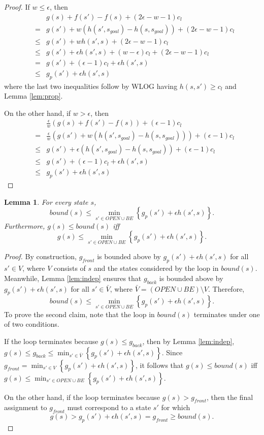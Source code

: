 \documentclass[letterpaper]{article}
\newtheorem{lemma}{Lemma}
\begin{document}
\begin{proof}
If $w \le \epsilon$, then
\begin{eqnarray*}
&&g(s) + f(s') - f(s) + (2\epsilon-w-1)c_l
\\&=& g(s') + w(h(s',s_{goal}) - h(s,s_{goal})) + (2\epsilon-w-1)c_l
\\&\le& g(s') + wh(s',s) + (2\epsilon-w-1)c_l
\\&\le& g(s') + \epsilon h(s',s) + (w-\epsilon)c_l + (2\epsilon-w-1)c_l
\\&=& g(s') + (\epsilon-1)c_l + \epsilon h(s',s)
\\&\le& g_p(s') + \epsilon h(s',s)
\end{eqnarray*}
where the last two inequalities follow by WLOG having $h(s,s') \ge c_l$ and Lemma \ref{lem:prop}.

On the other hand, if $w > \epsilon$, then
\begin{eqnarray*}
&&\frac\epsilon w\left(g(s) + f(s') - f(s)\right) + (\epsilon-1)c_l
\\&=& \frac\epsilon w\left(g(s') + w(h(s',s_{goal}) - h(s,s_{goal})) \right) + (\epsilon-1)c_l
\\&\le& g(s') + \epsilon(h(s',s_{goal}) - h(s,s_{goal})) + (\epsilon-1)c_l
\\&\le& g(s') + (\epsilon-1)c_l + \epsilon h(s',s)
\\&\le& g_p(s') + \epsilon h(s',s)
\end{eqnarray*}
\end{proof}

\begin{lemma}
\label{lem:bound}
For every state $s$,
\[bound(s) \le \min_{s'\in OPEN \cup BE} \left\{ g_p(s') + \epsilon h(s',s) \right\}.\]
Furthermore, $g(s) \le bound(s)$ iff
\[g(s) \le \min_{s'\in OPEN \cup BE} \left\{ g_p(s') + \epsilon h(s',s) \right\}.\]
\end{lemma}

\begin{proof}
By construction, $g_{front}$ is bounded above by $g_p(s') + \epsilon h(s',s)$ for all $s'\in V$, where $V$ consists of $s$ and the states considered by the loop in $bound(s)$. Meanwhile, Lemma \ref{lem:indep} ensures that $g_{back}$ is bounded above by $g_p(s') + \epsilon h(s',s)$ for all $s'\in \bar V$, where $\bar V = (OPEN \cup BE) \setminus V$. Therefore,
\[bound(s) \le \min_{s' \in OPEN \cup BE} \left\{g_p(s') + \epsilon h(s',s)\right\}.\]
To prove the second claim, note that the loop in $bound(s)$ terminates under one of two conditions.

If the loop terminates because $g(s) \le g_{back}$, then by Lemma \ref{lem:indep}, $g(s) \le g_{back} \le \min_{s'\in \bar V} \left\{ g_p(s') + \epsilon h(s',s) \right\}$. Since $g_{front} = \min_{s'\in V} \left\{ g_p(s') + \epsilon h(s',s) \right\}$, it follows that $g(s) \le bound(s)$ iff $g(s) \le \min_{s'\in OPEN \cup BE} \left\{ g_p(s') + \epsilon h(s',s) \right\}$.

On the other hand, if the loop terminates because $g(s) > g_{front}$, then the final assignment to $g_{front}$ must correspond to a state $s'$ for which
\[g(s) > g_p(s') + \epsilon h(s',s) = g_{front} \ge bound(s).\]
\end{proof}
\end{document}
